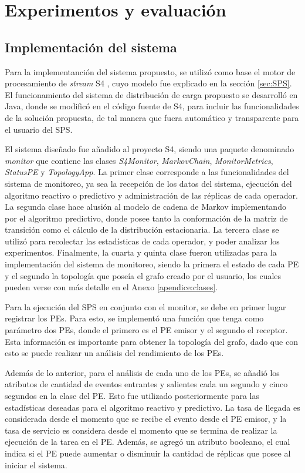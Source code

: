 \chapter{Experimentos y evaluación}
\label{cap:experimentos}

\section{Implementación del sistema}
Para la implementanción del sistema propuesto, se utilizó como base el motor de procesamiento de \textit{stream} S4 \citep{s4}, cuyo modelo fue explicado en la sección \ref{sec:SPS}. El funcionamiento del sistema de distribución de carga propuesto se desarrolló en Java, donde se modificó en el código fuente de S4, para incluir las funcionalidades de la solución propuesta, de tal manera que fuera automático y transparente para el usuario del SPS.

El sistema diseñado fue añadido al proyecto S4, siendo una paquete denominado \textit{monitor} que contiene las clases \textit{S4Monitor}, \textit{MarkovChain}, \textit{MonitorMetrics}, \textit{StatusPE} y \textit{TopologyApp}. La primer clase corresponde a las funcionalidades del sistema de monitoreo, ya sea la recepción de los datos del sistema, ejecución del algoritmo reactivo o predictivo y administración de las réplicas de cada operador. La segunda clase hace alusión al modelo de cadena de Markov implementando por el algoritmo predictivo, donde posee tanto la conformación de la matriz de transición como el cálculo de la distribución estacionaria. La tercera clase se utilizó para recolectar las estadísticas de cada operador, y poder analizar los experimentos. Finalmente, la cuarta y quinta clase fueron utilizadas para la implementación del sistema de monitoreo, siendo la primera el estado de cada PE y el segundo la topología que poseía el grafo creado por el usuario, los cuales pueden verse con más detalle en el Anexo \ref{apendice:clases}.

Para la ejecución del SPS en conjunto con el monitor, se debe en primer lugar registrar los PEs. Para esto, se implementó una función que tenga como parámetro dos PEs, donde el primero es el PE emisor y el segundo el receptor. Esta información es importante para obtener la topología del grafo, dado que con esto se puede realizar un análisis del rendimiento de los PEs.

Además de lo anterior, para el análisis de cada uno de los PEs, se añadió los atributos de cantidad de eventos entrantes y salientes cada un segundo y cinco segundos en la clase del PE. Esto fue utilizado posteriormente para las estadísticas deseadas para el algoritmo reactivo y predictivo. La tasa de llegada es considerada desde el momento que se recibe el evento desde el PE emisor, y la tasa de servicio es considera desde el momento que se termina de realizar la ejecución de la tarea en el PE. Además, se agregó un atributo booleano, el cual indica si el PE puede aumentar o disminuir la cantidad de réplicas que posee al iniciar el sistema.

